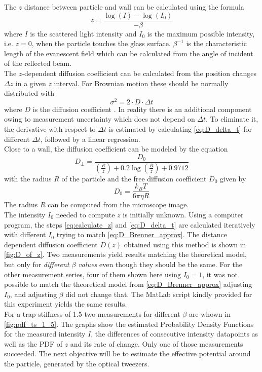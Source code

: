 \documentclass[
    twoside=false,
    twocolumn=true,
    fontsize=11pt,
]{scrarticle}
\begin{document}
The $z$ distance between particle and wall can be calculated using the formula \cite{instructions}
\begin{equation}
 \label{eq:calculate_z}
 z = \frac{\log(I) - \log(I_0)}{-\beta}
\end{equation}
where $I$ is the scattered light intensity and $I_0$ is the maximum possible intensity, i.e. $z=0$, when the particle touches the glass surface. $\beta^{-1}$ is the characteristic length of the evanescent field which can be calculated from the angle of incident of the reflected beam.\\
The $z$-dependent diffusion coefficient can be calculated from the position changes $\Delta z$ in a given $z$ interval. For Brownian motion these should be normally distributed with
\begin{equation}
\label{eq:D_delta_t}
 \sigma^2 = 2 \cdot D \cdot \Delta t
\end{equation}
where $D$ is the diffusion coefficient \cite{instructions}. In reality there is an additional component owing to measurement uncertainty which does not depend on $\Delta t$. To eliminate it, the derivative with respect to $\Delta t$ is estimated by calculating \autoref{eq:D_delta_t} for different $\Delta t$, followed by a linear regression.\\
Close to a wall, the diffusion coefficient can be modeled \cite{instructions} by the equation
\begin{equation}
 \label{eq:D_Brenner_approx}
 D_\bot = \frac{D_0}{\left(\frac{R}{z}\right) + 0.2 \log\left(\frac{R}{z}\right) + 0.9712}
\end{equation}
with the radius $R$ of the particle and the free diffusion coefficient $D_0$ given by \cite{instructions}
\begin{equation}
 \label{eq:D_0}
 D_0 = \frac{k_B T}{6 \pi \eta R}
\end{equation}
The radius $R$ can be computed from the microscope image.\\
The intensity $I_0$ needed to compute $z$ is initially unknown. Using a computer program, the steps \autoref{eq:calculate_z} and \autoref{eq:D_delta_t} are calculated iteratively with different $I_0$ trying to match \autoref{eq:D_Brenner_approx}. The distance dependent diffusion coefficient $D(z)$ obtained using this method is shown in \autoref{fig:D_of_z}. Two measurements yield results matching the theoretical model, but only for \textit{different $\beta$ values} even though they should be the same. For the other measurement series, four of them shown here using $I_0=1$, it was not possible to match the theoretical model from \autoref{eq:D_Brenner_approx} adjusting $I_0$, and adjusting $\beta$ did not change that. The MatLab script kindly provided for this experiment yields the same results.\\
For a trap stiffness of \SI{1.5}{} two measurements for different $\beta$ are whown in \autoref{fig:pdf_ts_1_5}. The graphs show the estimated Probability Density Functions for the measured intensity $I$, the differences of consecutive intensity datapoints as well as the PDF of $z$ and its rate of change. Only one of those measurements succeeded. The next objective will be to estimate the effective potential around the particle, generated by the optical tweezers.
\end{document}
